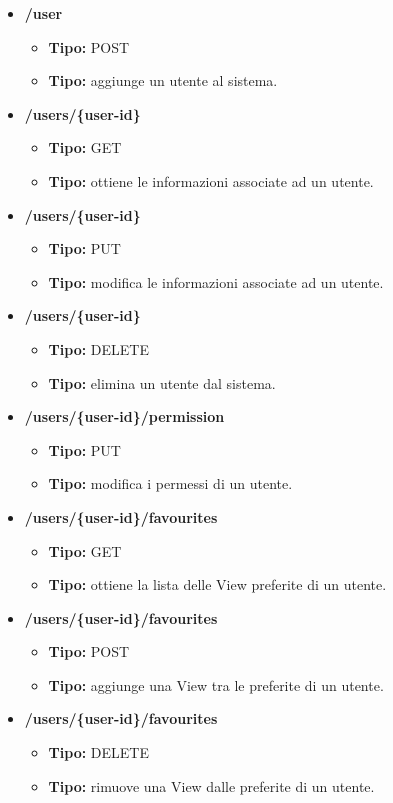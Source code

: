 \begin{itemize}

  \item \textbf{/user}
  \begin{itemize}
    \item \textbf{Tipo:} POST
    \item \textbf{Tipo:} aggiunge un utente al sistema.
  \end{itemize}
  \item \textbf{/users/\{user-id\}}
  \begin{itemize}
    \item \textbf{Tipo:} GET
    \item \textbf{Tipo:} ottiene le informazioni associate ad un utente.
  \end{itemize}
  \item \textbf{/users/\{user-id\}}
  \begin{itemize}
    \item \textbf{Tipo:} PUT
    \item \textbf{Tipo:} modifica le informazioni associate ad un utente.
  \end{itemize}
  \item \textbf{/users/\{user-id\}}
  \begin{itemize}
    \item \textbf{Tipo:} DELETE
    \item \textbf{Tipo:} elimina un utente dal sistema.
  \end{itemize}
  \item \textbf{/users/\{user-id\}/permission}
  \begin{itemize}
    \item \textbf{Tipo:} PUT
    \item \textbf{Tipo:} modifica i permessi di un utente.
  \end{itemize}
  \item \textbf{/users/\{user-id\}/favourites}
  \begin{itemize}
    \item \textbf{Tipo:} GET
    \item \textbf{Tipo:} ottiene la lista delle View preferite di un utente.
  \end{itemize}
  \item \textbf{/users/\{user-id\}/favourites}
  \begin{itemize}
    \item \textbf{Tipo:} POST
    \item \textbf{Tipo:} aggiunge una View tra le preferite di un utente.
  \end{itemize}
  \item \textbf{/users/\{user-id\}/favourites}
  \begin{itemize}
    \item \textbf{Tipo:} DELETE
    \item \textbf{Tipo:} rimuove una View dalle preferite di un utente.
  \end{itemize}


\end{itemize}
